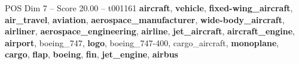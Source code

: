 \begin{textsample}{POS Dim 7 – Score 20.00 – t001161}  \label{ex:f7_pos_020}
\textbf{aircraft}, \textbf{vehicle}, \textbf{fixed-wing\_aircraft}, \textbf{air\_travel}, \textbf{aviation}, \textbf{aerospace\_manufacturer}, \textbf{wide-body\_aircraft}, \textbf{airliner}, \textbf{aerospace\_engineering}, \textbf{airline}, \textbf{jet\_aircraft}, \textbf{aircraft\_engine}, \textbf{airport}, boeing\_747, \textbf{logo}, boeing\_747-400, cargo\_aircraft, \textbf{monoplane}, \textbf{cargo}, \textbf{flap}, \textbf{boeing}, \textbf{fin}, \textbf{jet\_engine}, \textbf{airbus}

\end{textsample}
